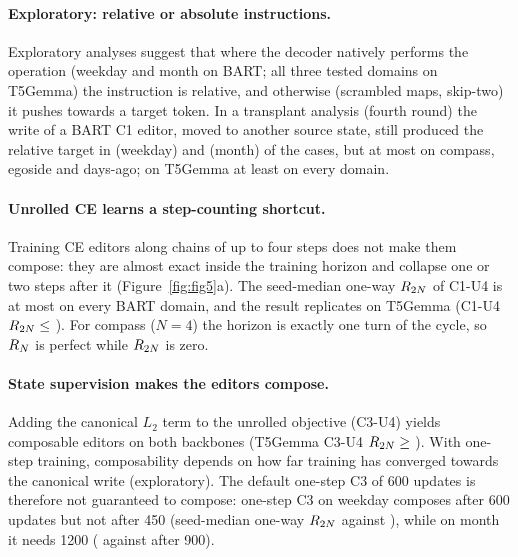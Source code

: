 \paragraph{Exploratory: relative or absolute instructions.}
Exploratory analyses suggest that where the decoder natively performs the operation (weekday and month on BART; all three tested
domains on T5Gemma) the instruction is relative, and otherwise (scrambled maps, skip-two) it pushes towards a target token.
In a transplant analysis (fourth round) the write of a BART C1 editor, moved to another source state, still produced the relative
target in \CLtwobRelWeekday{} (weekday) and \CLtwobRelMonth{} (month) of the cases, but at most \CLtwobRelOtherMax{} on compass,
egoside and days-ago; on T5Gemma at least \CLtwobRelTfiveMin{} on every domain.

\paragraph{Unrolled CE learns a step-counting shortcut.}
Training CE editors along chains of up to four steps does not make them compose: they are almost exact inside the training horizon and
collapse one or two steps after it (Figure~\ref{fig:fig5}a). The seed-median one-way $R_{2N}$ of C1-U4 is at most
\CLthreeUoneMedianMax{} on every BART domain, and the result replicates on T5Gemma (C1-U4 $R_{2N}\le$ \CLthreeTfiveCOneUfour{}).
For compass ($N=4$) the horizon is exactly one turn of the cycle, so $R_{N}$ is perfect while $R_{2N}$ is zero.

\paragraph{State supervision makes the editors compose.}
Adding the canonical $L_2$ term to the unrolled objective (C3-U4) yields composable editors on both backbones (T5Gemma C3-U4
$R_{2N}\ge$ \CLfourTfiveCThreeUfour{}). With one-step training, composability depends on how far training has converged towards the
canonical write (exploratory). The default one-step C3 of 600 updates is therefore not guaranteed to
compose: one-step C3 on weekday composes after 600 updates but not after 450 (seed-median one-way
$R_{2N}$ \CLfourWeekSixHundred{} against \CLfourWeekFourFifty{}), while on month it needs 1200 (\CLfourMonthTwelveHundred{} against
\CLfourMonthNineHundred{} after 900).

